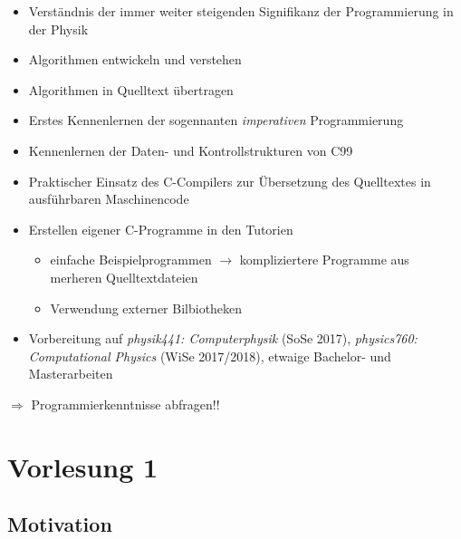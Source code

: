 \begin{itemize}
  \item{Verständnis der immer weiter steigenden Signifikanz der Programmierung in der Physik}
  \item{Algorithmen entwickeln und verstehen}
  \item{Algorithmen in Quelltext übertragen}
  \item{Erstes Kennenlernen der sogennanten \emph{imperativen} Programmierung}
  \item{Kennenlernen der Daten- und Kontrollstrukturen von C99}
  \vspace{0.5cm}
  \item{Praktischer Einsatz des C-Compilers zur Übersetzung des Quelltextes in ausführbaren Maschinencode}
  \item{Erstellen eigener C-Programme in den Tutorien}
  \begin{itemize}
    \item{einfache Beispielprogrammen $\rightarrow$ kompliziertere Programme aus merheren Quelltextdateien}
    \item{Verwendung externer Bilbiotheken}
  \end{itemize}
  \vspace{0.5cm}
  \item{Vorbereitung auf \emph{physik441: Computerphysik} (SoSe 2017), \emph{physics760: Computational Physics} (WiSe 2017/2018), etwaige Bachelor- und Masterarbeiten}
\end{itemize}

\iflecturer
\begin{framed}
  $\Rightarrow$ Programmierkenntnisse abfragen!!
\end{framed}
\fi

\section{Vorlesung 1}

\subsection{Motivation}

\iflecturer
\begin{framed}
  
\end{framed}
\fi

